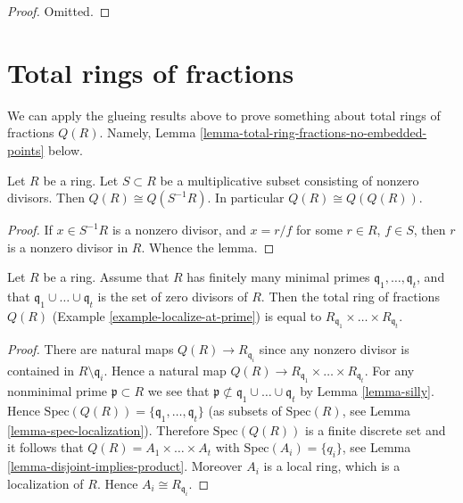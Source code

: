 \begin{proof}
Omitted.
\end{proof}












\section{Total rings of fractions}
\label{section-total-quotient-ring}

\noindent
We can apply the glueing results above to prove something about
total rings of fractions $Q(R)$. Namely,
Lemma \ref{lemma-total-ring-fractions-no-embedded-points} below.

\begin{lemma}
\label{lemma-total-ring-fractions}
Let $R$ be a ring.
Let $S \subset R$ be a multiplicative subset consisting of nonzero
divisors. Then $Q(R) \cong Q(S^{-1}R)$.
In particular $Q(R) \cong Q(Q(R))$.
\end{lemma}

\begin{proof}
If $x \in S^{-1}R$ is a nonzero divisor, and
$x = r/f$ for some $r \in R$, $f \in S$, then
$r$ is a nonzero divisor in $R$. Whence the lemma.
\end{proof}

\begin{lemma}
\label{lemma-total-ring-fractions-no-embedded-points}
Let $R$ be a ring.
Assume that $R$ has finitely many minimal primes
$\mathfrak q_1, \ldots, \mathfrak q_t$, and that
$\mathfrak q_1 \cup \ldots \cup \mathfrak q_t$ is the set
of zero divisors of $R$.
Then the total ring of fractions $Q(R)$
(Example \ref{example-localize-at-prime}) is equal to
$R_{\mathfrak q_1} \times \ldots \times R_{\mathfrak q_t}$.
\end{lemma}

\begin{proof}
There are natural maps $Q(R) \to R_{\mathfrak q_i}$ since
any nonzero divisor is contained in $R \setminus \mathfrak q_i$.
Hence a natural map
$Q(R) \to R_{\mathfrak q_1} \times \ldots \times R_{\mathfrak q_t}$.
For any nonminimal prime $\mathfrak p \subset R$ we see that
$\mathfrak p \not \subset \mathfrak q_1 \cup \ldots \cup \mathfrak q_t$
by Lemma \ref{lemma-silly}. Hence
$\text{Spec}(Q(R)) = \{\mathfrak q_1, \ldots, \mathfrak q_t\}$
(as subsets of $\text{Spec}(R)$, see Lemma \ref{lemma-spec-localization}).
Therefore $\text{Spec}(Q(R))$ is a finite discrete set and
it follows that $Q(R) = A_1 \times \ldots \times A_t$
with $\text{Spec}(A_i) = \{q_i\}$, see
Lemma \ref{lemma-disjoint-implies-product}.
Moreover $A_i$ is a local ring, which is a localization
of $R$. Hence $A_i \cong R_{\mathfrak q_i}$.
\end{proof}


















